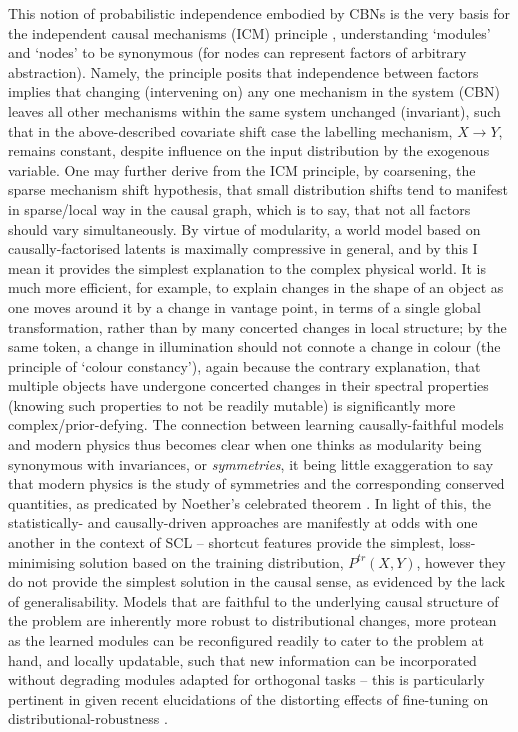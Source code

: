 %
This notion of probabilistic independence embodied by \acp{CBN} is the very basis for the
independent causal mechanisms (ICM) principle \citep{scholkopf2021toward}, understanding `modules'
and `nodes' to be synonymous (for nodes can represent factors of arbitrary abstraction).
%
Namely, the principle posits that independence between factors implies that changing (intervening
on) any one mechanism in the system (CBN) leaves all other mechanisms within the same system
unchanged (invariant), such that in the above-described covariate shift case the labelling
mechanism, \(X \to Y\), remains constant, despite influence on the input distribution by the
exogenous variable.
%
%
One may further derive from the ICM principle, by coarsening, the sparse mechanism shift
hypothesis, that small distribution shifts tend to manifest in sparse/local way in the causal
graph, which is to say, that not all factors should vary simultaneously.
%
By virtue of modularity, a world model based on causally-factorised latents is maximally
compressive in general, and by this I mean it provides the simplest explanation to the complex
physical world.
%
It is much more efficient, for example, to explain changes in the shape of an object as one moves
around it by a change in vantage point, in terms of a single global transformation, rather than by
many concerted changes in local structure; by the same token, a change in illumination should not
connote a change in colour (the principle of `colour constancy'), again because the contrary
explanation, that multiple objects have undergone concerted changes in their spectral properties
(knowing such properties to not be readily mutable) is significantly more complex/prior-defying.
%
The connection between learning causally-faithful models and modern physics thus becomes clear when
one thinks as modularity being synonymous with invariances, or \emph{symmetries}, it being little
exaggeration to say that modern physics is the study of symmetries and the corresponding conserved
quantities, as predicated by Noether's celebrated theorem \citep{noether1918invariante}.
%
In light of this, the statistically- and causally-driven approaches are manifestly at odds with one
another in the context of \ac{SCL} -- shortcut features provide the simplest, loss-minimising
solution based on the training distribution, \(P^{tr}(X, Y)\), however they do not provide the
simplest solution in the causal sense, as evidenced by the lack of generalisability.
%
Models that are faithful to the underlying causal structure of the problem are inherently more
robust to distributional changes, more protean as the learned modules can be reconfigured readily
to cater to the problem at hand, and locally updatable, such that new information can be
incorporated without degrading modules adapted for orthogonal tasks -- this is particularly
pertinent in given recent elucidations of the distorting effects of fine-tuning on
distributional-robustness \citep{andreassen2021evolution, kumar2022finetuning}.

